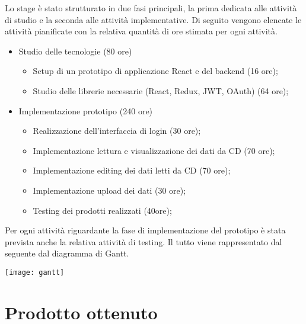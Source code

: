 Lo stage è stato strutturato in due fasi principali, la prima dedicata alle attività di studio e la seconda alle attività implementative. Di seguito vengono elencate le attività pianificate con la relativa quantità di ore stimata per ogni attività.

\begin{itemize}
  \item Studio delle tecnologie (80 ore)
        \begin{itemize}
          \item Setup di un prototipo di applicazione React e del backend (16 ore);
          \item Studio delle librerie necessarie (React, Redux, JWT, OAuth) (64 ore);
        \end{itemize}
  \item Implementazione prototipo (240 ore)
        \begin{itemize}
          \item Realizzazione dell’interfaccia di login (30 ore);
          \item Implementazione lettura e visualizzazione dei dati da CD (70 ore);
          \item Implementazione editing dei dati letti da CD (70 ore);
          \item Implementazione upload dei dati (30 ore);
          \item Testing dei prodotti realizzati (40ore);
        \end{itemize}
\end{itemize}

Per ogni attività riguardante la fase di implementazione del prototipo è stata prevista anche la relativa attività di testing.
Il tutto viene rappresentato dal seguente dal diagramma di Gantt.
\begin{center}
  \texttt{[image: gantt]}
\end{center}

\section{Prodotto ottenuto}